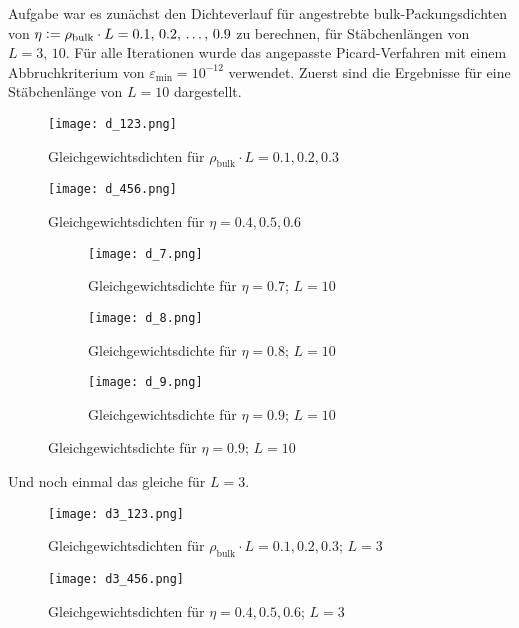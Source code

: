 \documentclass[12pt]{article}
\begin{document}
Aufgabe war es zunächst den Dichteverlauf für angestrebte bulk-Packungsdichten von $\eta\vcentcolon=\rho_\text{bulk}\cdot{L}=0.1,\,0.2,\,\dots,\,0.9$ zu berechnen, für Stäbchenlängen von $L=3,\,10$. Für alle Iterationen wurde das angepasste Picard-Verfahren mit einem Abbruchkriterium von $\varepsilon_\text{min}=10^{-12}$ verwendet. Zuerst sind die Ergebnisse für eine Stäbchenlänge von $L=10$ dargestellt.

\begin{figure}[H]\centering\texttt{[image: d\_123.png]}\caption{Gleichgewichtsdichten für $\rho_\text{bulk}\cdot{L}=0.1,0.2,0.3$}\end{figure}
\begin{figure}[H]\centering\texttt{[image: d\_456.png]}\caption{Gleichgewichtsdichten für $\eta=0.4,0.5,0.6$}\end{figure}

\begin{figure}[H]\hspace*{-1.5cm}
\begin{subfigure}{0.4\textwidth}
\texttt{[image: d\_7.png]}
\caption{Gleichgewichtsdichte\newline
für $\eta=0.7$; $L=10$}
\end{subfigure}
\hfill
\begin{subfigure}{0.4\textwidth}
\hspace*{-0.8cm}
\texttt{[image: d\_8.png]}
\caption{Gleichgewichtsdichte\newline
für $\eta=0.8$; $L=10$}
\end{subfigure}
\hfill
\hspace*{-1.5cm}
\begin{subfigure}{0.4\textwidth}
\texttt{[image: d\_9.png]}
\caption{Gleichgewichtsdichte\newline
für $\eta=0.9$; $L=10$}
\end{subfigure}
\hfill
\end{figure}\newpage
Und noch einmal das gleiche für $L=3$.

\begin{figure}[H]\centering\texttt{[image: d3\_123.png]}\caption{Gleichgewichtsdichten für $\rho_\text{bulk}\cdot{L}=0.1,0.2,0.3$; $L=3$}\end{figure}
\begin{figure}[H]\centering\texttt{[image: d3\_456.png]}\caption{Gleichgewichtsdichten für $\eta=0.4,0.5,0.6$; $L=3$}\end{figure}
\end{document}
